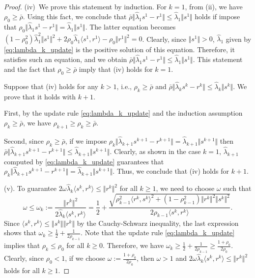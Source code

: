 \documentclass{article}
\theoremstyle{plain}
\theoremstyle{definition}
\newcommand{\norms}[1]{\Vert#1\Vert}
\newcommand{\iprods}[1]{\langle #1\rangle}
\newcommand{\0}{\boldsymbol{0}}
\begin{document}
\begin{proof}
(iv)~We prove this statement by induction.
 For $k = 1$, from (ii), we have $\rho_0 \geq \bar{\rho}$.
 Using this fact, we conclude that $\bar{\rho} \norms{\hat{\lambda}_1s^1 - r^1}  \leq \hat{\lambda}_1\norms{s^1}$ holds if impose that $\rho_0 \norms{\hat{\lambda}_1s^1 - r^1}  = \hat{\lambda}_1\norms{s^1}$.
The latter equation becomes $(1-\rho_0^2)\hat{\lambda}_1^2\norms{s^1}^2 + 2\rho_0\hat{\lambda}_1\iprods{s^1, r^1} - \rho_0\norms{r^1}^2 = 0$.
Clearly, since $\norms{s^1} > 0$,  $\hat{\lambda}_1$ given by \eqref{eq:lambda_k_update} is the positive solution of this equation. 
Therefore, it satisfies such an equation, and we obtain $\bar{\rho} \norms{\hat{\lambda}_1s^1 - r^1}  \leq \hat{\lambda}_1\norms{s^1}$.
This statement and the fact that $\rho_0 \geq \bar{\rho}$ imply that (iv) holds for $k = 1$.

Suppose that (iv) holds for any $k > 1$, i.e.,  $\rho_{k} \geq \bar{\rho}$ and $\bar{\rho} \norms{\hat{\lambda}_ks^k - r^k}  \leq \hat{\lambda}_k\norms{s^k}$.
We prove that it holds with $k + 1$.

First, by the update rule \eqref{eq:lambda_k_update} and the induction assumption $\rho_k \geq \bar{\rho}$, we have $\rho_{k+1} \geq \rho_k \geq \bar{\rho}$.

Second, since $\rho_k \geq \bar{\rho}$, if we impose $\rho_k \norms{\hat{\lambda}_{k+1}s^{k+1} - r^{k+1}}  = \hat{\lambda}_{k+1}\norms{s^{k+1}}$ then $\bar{\rho} \norms{\hat{\lambda}_{k+1}s^{k+1} - r^{k+1}}  \leq \hat{\lambda}_{k+1}\norms{s^{k+1}}$.
Clearly, as shown in the case $k=1$, $\hat{\lambda}_{k+1}$ computed by \eqref{eq:lambda_k_update} guarantees that $\rho_k \norms{\hat{\lambda}_{k+1}s^{k+1} - r^{k+1}}  = \hat{\lambda}_{k+1}\norms{s^{k+1}}$.
Thus, we conclude that (iv) holds for $k + 1$.

 (v). To guarantee $2\omega\hat{\lambda}_k\iprods{s^k, r^k} \leq \norms{r^k}^2$ for all $k \geq 1$, we need to choose $\omega$ such that
\begin{equation*}
\omega \leq \omega_k := \frac{\norms{r^k}^2}{2\hat{\lambda}_k\iprods{s^k, r^k}} = \frac{1}{2} + \frac{\sqrt{\rho_{k-1}^2\iprods{r^k, s^k}^2 + (1 - \rho_{k-1}^2 )\norms{r^k}^2\norms{s^k}^2} }{2\rho_{k-1}\iprods{s^k, r^k}}.
\end{equation*}
Since $\iprods{s^k, r^k} \leq \norms{s^k}\norms{r^k}$ by the Cauchy-Schwarz inequality, the last expression shows that $\omega_k \geq \frac{1}{2} + \frac{1}{2\rho_{k-1}}$.
Note that the update rule \eqref{eq:lambda_k_update} implies that $\rho_k \leq \rho_0$ for all $k \geq 0$.
Therefore, we have $\omega_k \geq \frac{1}{2} + \frac{1}{2\rho_{k-1}} \geq \frac{1+\rho_0}{2\rho_0}$.
Clearly, since $\rho_0 < 1$, if we choose $\omega :=  \frac{1 + \rho_0}{2\rho_0}$, then $\omega > 1$ and $2\omega\hat{\lambda}_k\iprods{s^k, r^k} \leq \norms{r^k}^2$ holds for all $k \geq 1$.
\end{proof}
\end{document}
